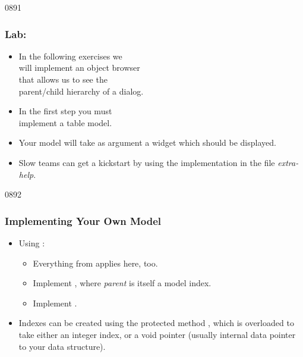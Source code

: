 \begin{slide}{0891}\frametitle{Lab: }
\begin{itemize}
\item In the following exercises we\\
  will implement an object browser\\
  that allows us to see the \\
  parent/child hierarchy of a dialog.
\item In the first step you must\\
  implement a table model. 
\item Your model will take as argument a widget which should be displayed.
\item Slow teams can get a kickstart by using the implementation in the
  file \emph{extra-help}.
\end{itemize}
\end{slide}

\begin{slide}{0892}\frametitle{Implementing Your Own Model}\label{model_indexes_start}
\begin{itemize}
\item Using :
  \begin{itemize}
  \item Everything from  applies here, too.
  \item Implement  , where
    \emph{parent} is itself a model index.
  \item Implement  .
  \end{itemize}
\item Indexes can be created using the protected method 
  , which is overloaded to
  take either an integer index, or a void pointer (usually internal data
  pointer to your data structure).
\end{itemize}
\end{slide}

